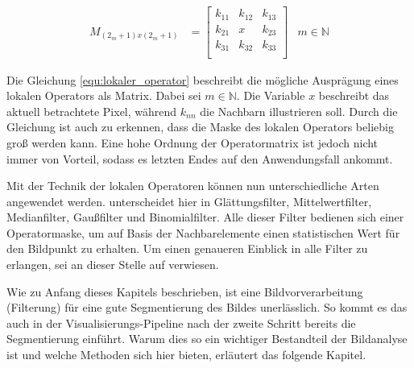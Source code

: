 \begin{align}
	\label{equ:lokaler_operator}M_{(2_m+1)x(2_m+1)} & = \begin{bmatrix}k_{11}&k_{12}&k_{13}\\ k_{21}&x&k_{23}\\ k_{31}&k_{32}&k_{33}\\\end{bmatrix} & m \in \mathbb{N}
\end{align}

Die Gleichung \ref{equ:lokaler_operator} beschreibt die mögliche Ausprägung
eines lokalen Operators als Matrix. Dabei sei $m \in \mathbb{N}$. Die Variable
$x$ beschreibt das aktuell betrachtete Pixel, während $k_{nn}$ die Nachbarn illustrieren
soll. Durch die Gleichung ist auch zu erkennen, dass die Maske des lokalen Operators
beliebig groß werden kann. Eine hohe Ordnung der Operatormatrix ist jedoch nicht
immer von Vorteil, sodass es letzten Endes auf den Anwendungsfall ankommt.

Mit der Technik der lokalen Operatoren können nun unterschiedliche Arten angewendet
werden. \citet[S.~54 - 55]{handels2000} unterscheidet hier in Glättungsfilter,
Mittelwertfilter, Medianfilter, Gaußfilter und Binomialfilter. Alle dieser Filter
bedienen sich einer Operatormaske, um auf Basis der Nachbarelemente einen
statistischen Wert für den Bildpunkt zu erhalten. Um einen genaueren Einblick in
alle Filter zu erlangen, sei an dieser Stelle auf \citet[S.~54 - 55]{handels2000}
verwiesen.

Wie zu Anfang dieses Kapitels beschrieben, ist eine Bildvorverarbeitung (Filterung)
für eine gute Segmentierung des Bildes unerlässlich. So kommt es das auch in der
Visualisierungs-Pipeline nach \citet[S.~50]{handels2000} der zweite Schritt
bereits die Segmentierung einführt. Warum dies so ein wichtiger Bestandteil der Bildanalyse
ist und welche Methoden sich hier bieten, erläutert das folgende Kapitel.

\pagebreak

